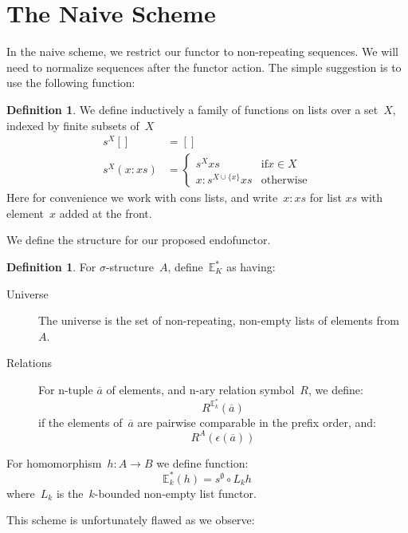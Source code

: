 \documentclass{article}
\theoremstyle{plain}
\theoremstyle{definition}
\newtheorem{definition}[theorem]{Definition}
\theoremstyle{remark}
\numberwithin{theorem}{section}
\begin{document}
\section{The Naive Scheme}
In the naive scheme, we restrict our functor to non-repeating sequences. We will need to normalize sequences after the functor action. The simple suggestion is to use the following function:
\begin{definition}
We define inductively a family of functions on lists over a set~$X$, indexed by finite subsets of~$X$
\begin{align*}
    s^X [] &= []\\
    s^X (x:xs) &=
    \begin{cases}
    s^X xs &\mbox{if} x \in X\\
    x : s^{X \cup \{ x \}} xs &\mbox{otherwise}
    \end{cases}
\end{align*}
Here for convenience we work with cons lists, and write~$x:xs$ for list $xs$ with element~$x$ added at the front.
\end{definition}
We define the structure for our proposed endofunctor.
\begin{definition}
For $\sigma$-structure~$A$, define~$\mathbb{E}^*_K$ as having:
\begin{description}
\item[Universe] The universe is the set of non-repeating, non-empty lists of elements from~$A$.
\item[Relations] For n-tuple $\overline{a}$ of elements, and n-ary relation symbol~$R$, we define:
\begin{equation*}
    R^{\mathbb{E}^*_k}(\overline{a})
\end{equation*}
if the elements of~$\overline{a}$ are pairwise comparable in the prefix order, and:
\begin{equation*}
    R^A(\epsilon(\overline{a}))
\end{equation*}
\end{description}
For homomorphism~$h : A \rightarrow B$ we define function:
\begin{equation*}
    \mathbb{E}^*_k(h) = s^\emptyset \circ L_k h
\end{equation*}
where~$L_k$ is the~$k$-bounded non-empty list functor.
\end{definition}
This scheme is unfortunately flawed as we observe:
\end{document}

